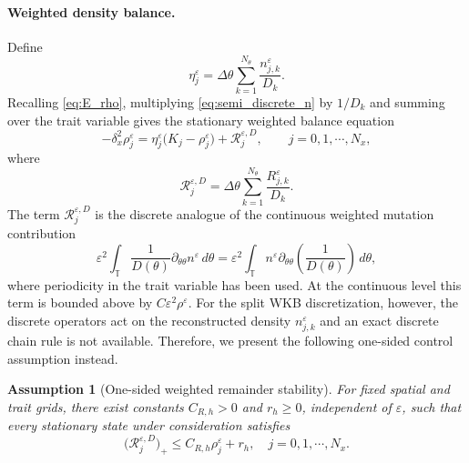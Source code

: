 \documentclass[11pt]{article}
\newtheorem{assumption}{Assumption}[section]
\begin{document}
\paragraph{Weighted density balance.}
Define
\begin{equation}\label{def:eta}
    \eta_j^\varepsilon
    =
    \Delta\theta
    \sum_{k=1}^{N_\theta}
    \frac{n_{j,k}^\varepsilon}{D_k}.
\end{equation}
Recalling \eqref{eq:E_rho}, multiplying \eqref{eq:semi_discrete_n} by \(1/D_k\) and summing over the
trait variable gives the stationary weighted balance equation
\begin{equation}\label{eq:weighted_summed_density_stationary}
    -\delta_x^2\rho_j^\varepsilon
    =
    \eta_j^\varepsilon
    \bigl(K_j-\rho_j^\varepsilon\bigr)
    +
    \mathcal R_j^{\varepsilon,D},
    \qquad j=0, 1,\cdots,N_x,
\end{equation}
where
\begin{equation}\label{def:R_D}
    \mathcal R_j^{\varepsilon,D}
    =
    \Delta\theta
    \sum_{k=1}^{N_\theta}
    \frac{R_{j,k}^\varepsilon}{D_k}.
\end{equation}
The term \(\mathcal R_j^{\varepsilon,D}\) is the discrete analogue of the
continuous weighted mutation contribution
\begin{equation}\label{eq:cts_R_expression}
    \varepsilon^2
    \int_{\mathbb T}
    \frac1{D(\theta)}
    \partial_{\theta\theta}n^\varepsilon
    \,d\theta
    =
    \varepsilon^2
    \int_{\mathbb T}
    n^\varepsilon
    \partial_{\theta\theta}\left(\frac1{D(\theta)}\right)
    \,d\theta ,
\end{equation}
where periodicity in the trait variable has been used.  At the continuous
level this term is bounded above by \(C\varepsilon^2\rho^\varepsilon\).  For
the split WKB discretization, however, the discrete operators act on the
reconstructed density
$
    n_{j,k}^\varepsilon
$
and an exact discrete chain rule is not available.  
Therefore, we present the following one-sided control assumption instead.  



\begin{assumption}[One-sided weighted remainder stability]
\label{ass:remainder_stability}
For fixed spatial and trait grids, there exist constants \(C_{R,h}>0\) and \(r_h\ge0\), independent of
\(\varepsilon\), such that every stationary state under consideration
satisfies
\begin{equation}\label{eq:remainder_CR_bound}
    \bigl(\mathcal R_j^{\varepsilon,D}\bigr)_+
    \le
    C_{R,h} \rho_j^\varepsilon+r_h,
    \quad j=0,1,\cdots, N_x.
\end{equation}
\end{assumption}
\end{document}

